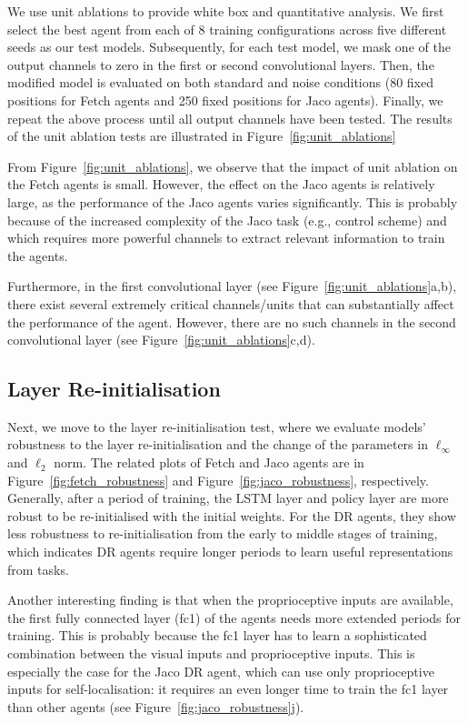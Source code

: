 We use unit ablations to provide white box and quantitative analysis. We first select the best agent from each of 8 training configurations across five different seeds as our test models. Subsequently, for each test model, we mask one of the output channels to zero in the first or second convolutional layers. Then, the modified model is evaluated on both standard and noise conditions (80 fixed positions for Fetch agents and 250 fixed positions for Jaco agents). Finally, we repeat the above process until all output channels have been tested. The results of the unit ablation tests are illustrated in Figure~\ref{fig:unit_ablations}

From Figure~\ref{fig:unit_ablations}, we observe that the impact of unit ablation on the Fetch agents is small. However, the effect on the Jaco agents is relatively large, as the performance of the Jaco agents varies significantly. This is probably because of the increased complexity of the Jaco task (e.g., control scheme) and which requires more powerful channels to extract relevant information to train the agents.


Furthermore, in the first convolutional layer (see Figure~\ref{fig:unit_ablations}a,b), there exist several extremely critical channels/units that can substantially affect the performance of the agent. However, there are no such channels in the second convolutional layer (see Figure~\ref{fig:unit_ablations}c,d).

\subsection{Layer Re-initialisation}
Next, we move to the layer re-initialisation test, where we evaluate models' robustness to the layer re-initialisation and the change of the parameters in $\ell_{\infty}$ and $\ell_{2}$ norm. The related plots of Fetch and Jaco agents are in Figure~\ref{fig:fetch_robustness} and Figure~\ref{fig:jaco_robustness}, respectively. Generally, after a period of training, the LSTM layer and policy layer are more robust to be re-initialised with the initial weights. For the DR agents, they show less robustness to re-initialisation from the early to middle stages of training, which indicates DR agents require longer periods to learn useful representations from tasks.

Another interesting finding is that when the proprioceptive inputs are available, the first fully connected layer (fc1) of the agents needs more extended periods for training. This is probably because the fc1 layer has to learn a sophisticated combination between the visual inputs and proprioceptive inputs. This is especially the case for the Jaco DR agent, which can use only proprioceptive inputs for self-localisation: it requires an even longer time to train the fc1 layer than other agents (see Figure~\ref{fig:jaco_robustness}j).

